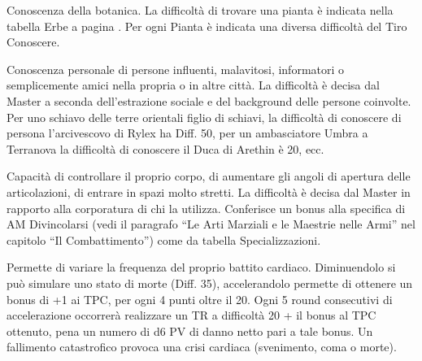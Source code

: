  Conoscenza della botanica. La
difficolt\`a di trovare una pianta \`e indicata nella tabella Erbe a
pagina \pageref{taberbe}. Per ogni Pianta \`e indicata una diversa
difficolt\`a del Tiro Conoscere.

\iffullversion
{} Conoscenza personale di persone influenti,
malavitosi, informatori o semplicemente amici nella propria o in altre
citt\`a. La difficolt\`a \`e decisa dal Master a seconda
dell'estrazione sociale e del background delle persone coinvolte. Per
uno schiavo delle terre orientali figlio di schiavi, la difficolt\`a
di conoscere di persona l'arcivescovo di Rylex ha Diff.  50, per un
ambasciatore Umbra a Terranova la difficolt\`a di conoscere il Duca di
Arethin \`e 20, ecc.

Capacit\`a di controllare il proprio corpo, di aumentare gli angoli
di apertura delle articolazioni, di entrare in spazi molto stretti. La
difficolt\`a \`e decisa dal Master in rapporto alla corporatura di
chi la utilizza. Conferisce un bonus alla specifica di AM Divincolarsi
(vedi il paragrafo ``Le Arti Marziali e le Maestrie nelle Armi'' nel
capitolo ``Il Combattimento'') come da tabella Specializzazioni.

 Permette di variare la
frequenza del proprio battito cardiaco.  Diminuendolo si pu\`o
simulare uno stato di morte (Diff. 35), accelerandolo permette di
ottenere un bonus di +1 ai TPC, per ogni 4 punti oltre il 20. Ogni 5
round consecutivi di accelerazione occorrer\`a realizzare un TR a
difficolt\`a 20 + il bonus al TPC ottenuto, pena un numero di d6 PV
di danno netto pari a tale bonus. Un fallimento catastrofico provoca
una crisi cardiaca (svenimento, coma o morte).  


